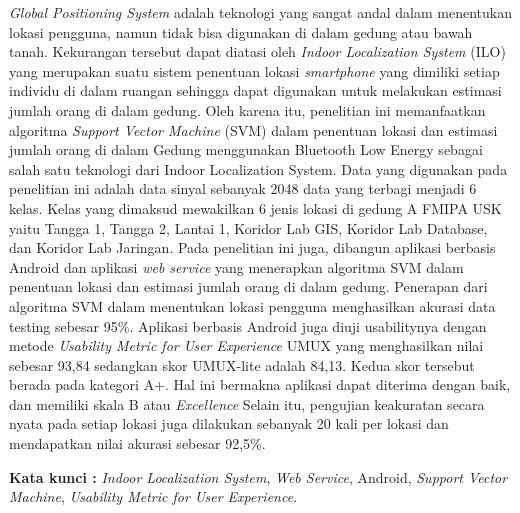\begin{abstractind}
	\textit{Global Positioning System} adalah teknologi yang sangat andal dalam menentukan lokasi pengguna, namun tidak bisa digunakan di dalam gedung atau bawah tanah. Kekurangan tersebut dapat diatasi oleh \textit{Indoor Localization System} (ILO) yang merupakan suatu sistem penentuan lokasi \textit{smartphone} yang dimiliki setiap individu di dalam ruangan sehingga dapat digunakan untuk melakukan estimasi jumlah orang di dalam gedung. Oleh karena itu, penelitian ini memanfaatkan algoritma \textit{Support Vector Machine} (SVM) dalam penentuan lokasi dan estimasi jumlah orang di dalam Gedung menggunakan Bluetooth Low Energy sebagai salah satu teknologi dari Indoor Localization System. Data yang digunakan pada penelitian ini adalah data sinyal sebanyak 2048 data yang terbagi menjadi 6 kelas. Kelas yang dimaksud mewakilkan 6 jenis lokasi di gedung A FMIPA USK yaitu Tangga 1, Tangga 2, Lantai 1, Koridor Lab GIS, Koridor Lab Database, dan Koridor Lab Jaringan. Pada penelitian ini juga, dibangun aplikasi berbasis Android dan aplikasi \textit{web service} yang menerapkan algoritma SVM dalam penentuan lokasi dan estimasi jumlah orang di dalam gedung. Penerapan dari algoritma SVM dalam menentukan lokasi pengguna menghasilkan akurasi data testing sebesar 95\%. Aplikasi berbasis Android juga diuji usabilitynya dengan metode \textit{Usability Metric for User Experience} UMUX yang menghasilkan nilai  sebesar 93,84 sedangkan skor UMUX-lite adalah 84,13. Kedua skor tersebut berada pada kategori A+. Hal ini bermakna aplikasi dapat diterima dengan baik, dan memiliki skala B atau \textit{Excellence} Selain itu, pengujian keakuratan secara nyata  pada setiap lokasi juga dilakukan sebanyak 20 kali per lokasi dan mendapatkan nilai akurasi sebesar 92,5\%.

	\bigskip
	\noindent
	\textbf{Kata kunci :} \textit{Indoor Localization System}, \textit{Web Service}, Android, \textit{Support Vector Machine}, \textit{Usability Metric for User Experience}.
\end{abstractind}